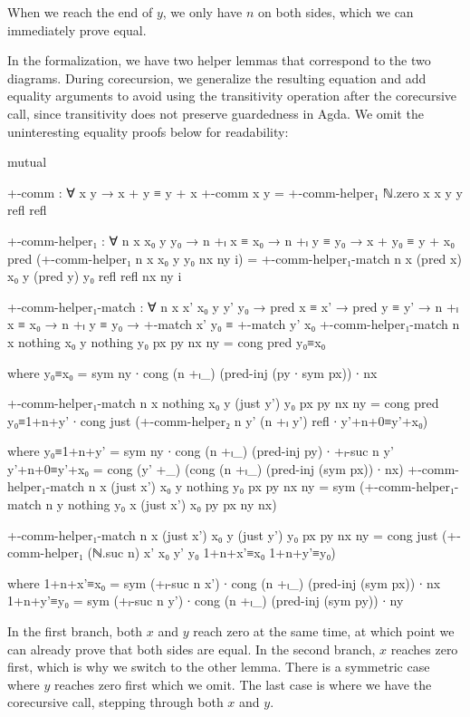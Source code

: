 When we reach the end of $y$, we only have $n$ on both sides, which we can
immediately prove equal.

In the formalization, we have two helper lemmas that correspond to the two
diagrams. During corecursion, we generalize the resulting equation and add
equality arguments to avoid using the transitivity operation after the
corecursive call, since transitivity does not preserve guardedness in Agda. We omit
the uninteresting equality proofs below for readability:
\begin{AgdaSuppressSpace}
\begin{code}[hide]
mutual
\end{code}
\begin{code}
  +-comm : ∀ x y → x + y ≡ y + x
  +-comm x y = +-comm-helper₁ ℕ.zero x x y y refl refl

  +-comm-helper₁ :
    ∀ n x x₀ y y₀ → n +ₗ x ≡ x₀ → n +ₗ y ≡ y₀ →
    x + y₀ ≡ y + x₀
  pred (+-comm-helper₁ n x x₀ y y₀ nx ny i) =
    +-comm-helper₁-match n x (pred x) x₀ y (pred y) y₀
      refl refl nx ny i

  +-comm-helper₁-match :
    ∀ n x x' x₀ y y' y₀ →
    pred x ≡ x' → pred y ≡ y' →
    n +ₗ x ≡ x₀ → n +ₗ y ≡ y₀ →
    +-match x' y₀ ≡ +-match y' x₀
  +-comm-helper₁-match
    n x nothing x₀ y nothing y₀ px py nx ny =
      cong pred y₀≡x₀
\end{code}
\begin{code}[hide]
      where
      y₀≡x₀ = sym ny ∙ cong (n +ₗ_) (pred-inj (py ∙ sym px)) ∙ nx
\end{code}
\begin{code}
  +-comm-helper₁-match
    n x nothing x₀ y (just y') y₀ px py nx ny =
      cong pred y₀≡1+n+y' ∙
      cong just
        (+-comm-helper₂ n y' (n +ₗ y') refl ∙ y'+n+0≡y'+x₀)
\end{code}
\begin{code}[hide]
    where
    y₀≡1+n+y' = sym ny ∙ cong (n +ₗ_) (pred-inj py) ∙ +ₗ-suc n y'
    y'+n+0≡y'+x₀ = cong (y' +_) (cong (n +ₗ_) (pred-inj (sym px)) ∙ nx)
  +-comm-helper₁-match
    n x (just x') x₀ y nothing y₀ px py nx ny =
      sym (+-comm-helper₁-match n y nothing y₀ x (just x') x₀ py px ny nx)
\end{code}
\begin{code}
  +-comm-helper₁-match
    n x (just x') x₀ y (just y') y₀ px py nx ny =
      cong just
        (+-comm-helper₁ (ℕ.suc n) x' x₀ y' y₀
          1+n+x'≡x₀ 1+n+y'≡y₀)
\end{code}
\begin{code}[hide]
    where
    1+n+x'≡x₀ = sym (+ₗ-suc n x') ∙ cong (n +ₗ_) (pred-inj (sym px)) ∙ nx
    1+n+y'≡y₀ = sym (+ₗ-suc n y') ∙ cong (n +ₗ_) (pred-inj (sym py)) ∙ ny
\end{code}
\end{AgdaSuppressSpace}
In the first branch, both $x$ and $y$ reach zero at the same time, at which
point we can already prove that both sides are equal. In the second branch, $x$
reaches zero first, which is why we switch to the other lemma. There is a
symmetric case where $y$ reaches zero first which we omit. The last case is
where we have the corecursive call, stepping through both $x$ and $y$.

